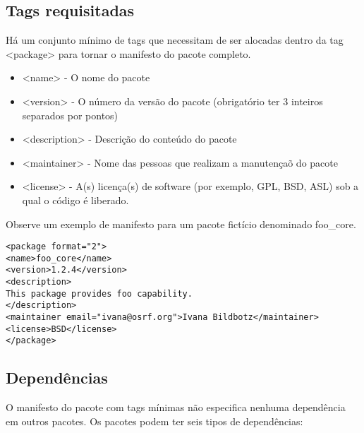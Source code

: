 \subsection{Tags requisitadas}

Há um conjunto mínimo de tags que necessitam de ser alocadas dentro da tag <package> para tornar o manifesto do pacote completo.

\begin{itemize}
	\setlength{\itemsep}{1pt}
	\setlength{\parskip}{0pt}
	\setlength{\parsep}{0pt}
	\item[] <name> - O nome do pacote
	\item[] <version> - O número da versão do pacote (obrigatório ter 3 inteiros separados por pontos)
	\item[] <description> - Descrição do conteúdo do pacote
	\item[] <maintainer> - Nome das pessoas que realizam a manutençaõ do pacote
	\item[] <license> - A(s) licença(s) de software (por exemplo, GPL, BSD, ASL) sob a qual o código é liberado.
\end{itemize}


Observe um exemplo de manifesto para um pacote fictício denominado foo\_core.

\begin{verbatim}
<package format="2">
<name>foo_core</name>
<version>1.2.4</version>
<description>
This package provides foo capability.
</description>
<maintainer email="ivana@osrf.org">Ivana Bildbotz</maintainer>
<license>BSD</license>
</package>
\end{verbatim}

\subsection{Dependências}

O manifesto do pacote com tags mínimas não especifica nenhuma dependência em outros pacotes. Os pacotes podem ter seis tipos de dependências:

